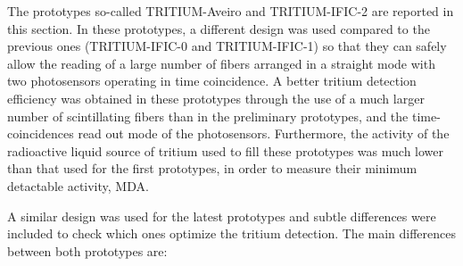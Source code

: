 The prototypes so-called TRITIUM-Aveiro and TRITIUM-IFIC-2 are reported in this section. In these prototypes, a different design was used compared to the previous ones (TRITIUM-IFIC-0 and TRITIUM-IFIC-1) so that they can safely allow the reading of a large number of fibers arranged in a straight mode with two photosensors operating in time coincidence. A better tritium detection efficiency was obtained in these prototypes through the use of a much larger number of scintillating fibers than in the preliminary prototypes, and the time-coincidences read out mode of the photosensors. Furthermore, the activity of the radioactive liquid source of tritium used to fill these prototypes was much lower than that used for the first prototypes, in order to measure their minimum detactable activity, MDA. 

A similar design was used for the latest prototypes and subtle differences were included to check which ones optimize the tritium detection. The main differences between both prototypes are:

